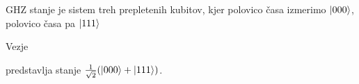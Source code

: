 \documentclass[mat1]{fmfdelo}
\begin{document}
GHZ stanje je sistem treh prepletenih kubitov, kjer polovico časa izmerimo \(\ket{000}\), polovico časa pa \(\ket{111}\)
\begin{izrek}
    Vezje
    \begin{center}
    \end{center}
    predstavlja stanje \(\frac{1}{\sqrt2}(\ket{000}+\ket{111})\).
\end{izrek}
\end{document}
